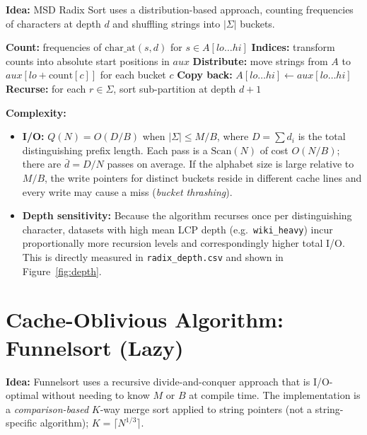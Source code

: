 \documentclass{article}
\begin{document}
\textbf{Idea:} MSD Radix Sort uses a distribution-based approach, counting
frequencies of characters at depth $d$ and shuffling strings into $|\Sigma|$
buckets.

\begin{algorithm}
\caption{MSD Radix Sort ($A,\,lo,\,hi,\,d,\,aux$)}
\begin{algorithmic}[1]
\State \textbf{Count:} frequencies of $\text{char\_at}(s,d)$ for $s \in A[lo \ldots hi]$
\State \textbf{Indices:} transform counts into absolute start positions in $aux$
\State \textbf{Distribute:} move strings from $A$ to $aux[lo + \text{count}[c]]$ for each bucket $c$
\State \textbf{Copy back:} $A[lo \ldots hi] \gets aux[lo \ldots hi]$
\State \textbf{Recurse:} for each $r \in \Sigma$, sort sub-partition at depth $d+1$
\end{algorithmic}
\end{algorithm}

\textbf{Complexity:}
\begin{itemize}
  \item \textbf{I/O:} $Q(N) = O(D/B)$ when $|\Sigma| \le M/B$, where
        $D = \sum d_i$ is the total distinguishing prefix length.  Each pass is a
        $\text{Scan}(N)$ of cost $O(N/B)$; there are $\bar{d} = D/N$ passes on
        average.  If the alphabet size is large relative to $M/B$, the write
        pointers for distinct buckets reside in different cache lines and every
        write may cause a miss (\emph{bucket thrashing}).
  \item \textbf{Depth sensitivity:} Because the algorithm recurses once per
        distinguishing character, datasets with high mean LCP depth (e.g.\
        \texttt{wiki\_heavy}) incur proportionally more recursion levels and
        correspondingly higher total I/O.  This is directly measured in
        \texttt{radix\_depth.csv} and shown in Figure~\ref{fig:depth}.
\end{itemize}

\section{Cache-Oblivious Algorithm: Funnelsort (Lazy)}

\textbf{Idea:} Funnelsort uses a recursive divide-and-conquer approach that is
I/O-optimal without needing to know $M$ or $B$ at compile time.  The
implementation is a \emph{comparison-based} $K$-way merge sort applied to
string pointers (not a string-specific algorithm); $K = \lceil N^{1/3} \rceil$.
\end{document}
